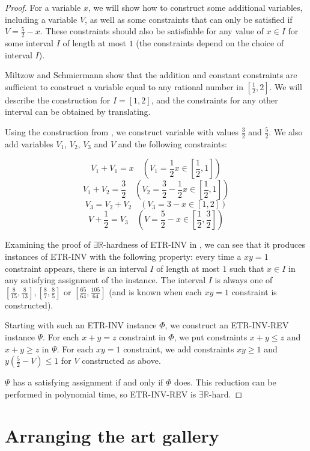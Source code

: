\documentclass[11pt]{article}
\newcommand{\rr}{\mathbb R}
\theoremstyle{plain}
\theoremstyle{definition}
\numberwithin{theorem}{section}
\begin{document}
\begin{proof}
For a variable $x$, we will show how to construct some additional variables, including a variable $V$, as well as some constraints that can only be satisfied if $V=\frac52-x$. These constraints should also be satisfiable for any value of $x\in I$ for some interval $I$ of length at most $1$ (the constraints depend on the choice of interval $I$).

Miltzow and Schmiermann \cite{ConvexConcave} show that the addition and constant constraints are sufficient to construct a variable equal to any rational number in $[\frac12, 2]$. We will describe the construction for $I=[1, 2]$, and the constraints for any other interval can be obtained by translating.

Using the construction from \cite{ConvexConcave}, we construct variable with values $\frac32$ and $\frac52$. We also add variables $V_1$, $V_2$, $V_3$ and $V$ and the following constraints:

\[V_1+V_1=x\quad\left(V_1=\frac12x\in[\frac12, 1]\right)\]
\[V_1+V_2=\frac32\quad\left(V_2=\frac32-\frac12x\in[\frac12, 1]\right)\]
\[V_3=V_2+V_2\quad\left(V_3=3-x\in[1, 2]\right)\]
\[V+\frac12=V_3\quad\left(V=\frac52-x\in[\frac12, \frac32]\right)\]

Examining the proof of $\exists\rr$-hardness of ETR-INV in \cite{ExistsRHardness}, we can see that it produces instances of ETR-INV with the following property: every time a $xy=1$ constraint appears, there is an interval $I$ of length at most $1$ such that $x\in I$ in any satisfying assignment of the instance. The interval $I$ is always one of $[\frac{8}{15}, \frac{8}{13}], [\frac{8}{7}, \frac{8}{5}]$ or $[\frac{65}{64}, \frac{105}{64}]$ (and is known when each $xy=1$ constraint is constructed). 

Starting with such an ETR-INV instance $\Phi$, we construct an ETR-INV-REV instance $\Psi$. For each $x+y=z$ constraint in $\Phi$, we put constraints $x+y\le z$ and $x+y\ge z$ in $\Psi$. For each $xy=1$ constraint, we add constraints $xy\ge 1$ and $y\left(\frac52-V\right)\le 1$ for $V$ constructed as above.

$\Psi$ has a satisfying assignment if and only if $\Phi$ does. This reduction can be performed in polynomial time, so ETR-INV-REV is $\exists\rr$-hard.
\end{proof}

\section{Arranging the art gallery}\label{sec:Arrangement}
\end{document}
